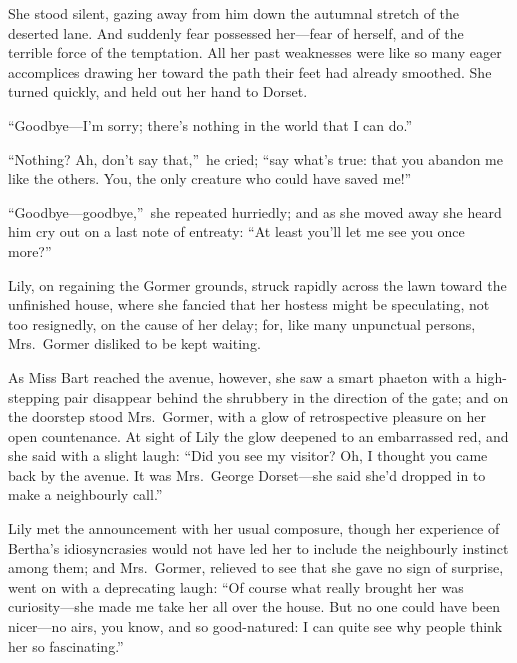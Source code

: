 \documentclass[12pt,a4paper]{book}
\begin{document}
She stood silent, gazing away from him down the autumnal stretch
of the deserted lane. And suddenly fear possessed her---fear of
herself, and of the terrible force of the temptation. All her
past weaknesses were like so many eager accomplices drawing her
toward the path their feet had already smoothed. She turned
quickly, and held out her hand to Dorset.





``Goodbye---I'm sorry; there's nothing in the world that I can do.''





``Nothing? Ah, don't say that,''\ he cried; ``say what's true: that
you abandon me like the others. You, the only creature who could
have saved me!''





``Goodbye---goodbye,''\ she repeated hurriedly; and as she
moved away she heard him cry out on a last note of entreaty: ``At
least you'll let me see you once more?''







Lily, on regaining the Gormer grounds, struck rapidly across the
lawn toward the unfinished house, where she fancied that her
hostess might be speculating, not too resignedly, on the cause of
her delay; for, like many unpunctual persons, Mrs.\ Gormer
disliked to be kept waiting.





As Miss Bart reached the avenue, however, she saw a smart phaeton
with a high-stepping pair disappear behind the shrubbery in the
direction of the gate; and on the doorstep stood Mrs.\ Gormer,
with a glow of retrospective pleasure on her open countenance. At
sight of Lily the glow deepened to an embarrassed red, and she
said with a slight laugh: ``Did you see my visitor? Oh, I thought
you came back by the avenue. It was Mrs.\ George Dorset---she said
she'd dropped in to make a neighbourly call.''





Lily met the announcement with her usual composure, though her
experience of Bertha's idiosyncrasies would not have led her to
include the neighbourly instinct among them; and Mrs.\ Gormer,
relieved to see that she gave no sign of surprise, went on with a
deprecating laugh: ``Of course what really brought her was
curiosity---she made me take her all over the house. But no one
could have been nicer---no airs, you know, and so good-natured: I
can quite see why people think her so fascinating.''
\end{document}

